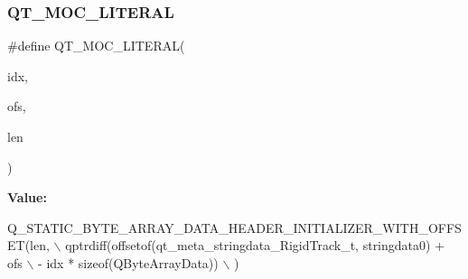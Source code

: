 \subsubsection{Q\+T\+\_\+\+M\+O\+C\+\_\+\+L\+I\+T\+E\+R\+AL}
{\footnotesize\ttfamily \#define Q\+T\+\_\+\+M\+O\+C\+\_\+\+L\+I\+T\+E\+R\+AL(\begin{DoxyParamCaption}\item[{}]{idx,  }\item[{}]{ofs,  }\item[{}]{len }\end{DoxyParamCaption})}

{\bfseries Value\+:}
\begin{DoxyCode}
Q\_STATIC\_BYTE\_ARRAY\_DATA\_HEADER\_INITIALIZER\_WITH\_OFFSET(len, \(\backslash\)
    qptrdiff(offsetof(qt_meta_stringdata_RigidTrack_t, stringdata0) + ofs \(\backslash\)
        - idx * \textcolor{keyword}{sizeof}(QByteArrayData)) \(\backslash\)
    )
\end{DoxyCode}
